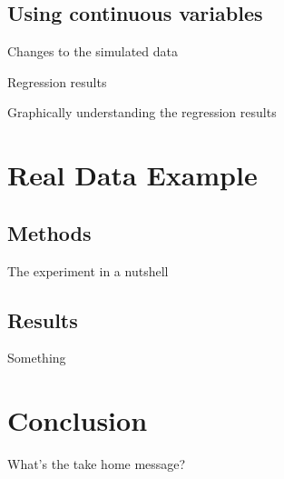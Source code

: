 \documentclass{beamer}
\begin{document}
\subsection{Using continuous variables}

\begin{frame}{Changes to the simulated data}

\end{frame}

\begin{frame}{Regression results}

\end{frame}

\begin{frame}{Graphically understanding the regression results}

\end{frame}

\section{Real Data Example}

\subsection{Methods}

\begin{frame}{The experiment in a nutshell}

\end{frame}

\subsection{Results}

\begin{frame}{Something}

\end{frame}

\section{Conclusion}

\begin{frame}{What's the take home message?}

\end{frame}
\end{document}
